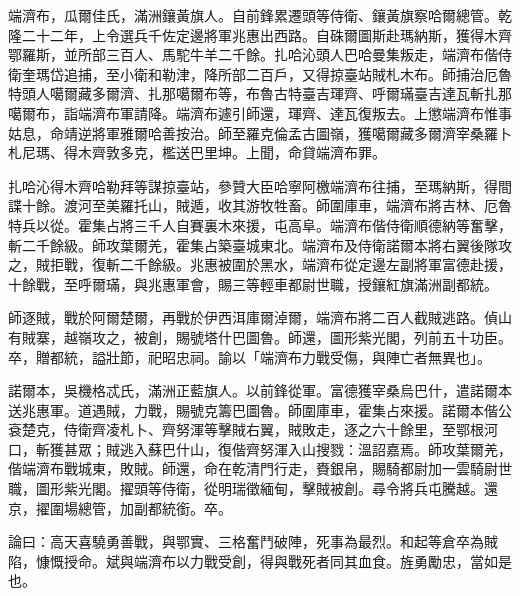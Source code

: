 \begin{pinyinscope}
端濟布，瓜爾佳氏，滿洲鑲黃旗人。自前鋒累遷頭等侍衛、鑲黃旗察哈爾總管。乾隆二十二年，上令選兵千佐定邊將軍兆惠出西路。自硃爾圖斯赴瑪納斯，獲得木齊鄂羅斯，並所部三百人、馬駝牛羊二千餘。扎哈沁頭人巴哈曼集叛走，端濟布偕侍衛奎瑪岱追捕，至小衛和勒津，降所部二百戶，又得掠臺站賊札木布。師捕治厄魯特頭人噶爾藏多爾濟、扎那噶爾布等，布魯古特臺吉琿齊、呼爾璊臺吉達瓦斬扎那噶爾布，詣端濟布軍請降。端濟布遽引師還，琿齊、達瓦復叛去。上懲端濟布惟事姑息，命靖逆將軍雅爾哈善按治。師至羅克倫孟古圖嶺，獲噶爾藏多爾濟宰桑羅卜札尼瑪、得木齊敦多克，檻送巴里坤。上聞，命貸端濟布罪。

扎哈沁得木齊哈勒拜等謀掠臺站，參贊大臣哈寧阿檄端濟布往捕，至瑪納斯，得間諜十餘。渡河至美羅托山，賊遁，收其游牧牲畜。師圍庫車，端濟布將吉林、厄魯特兵以從。霍集占將三千人自賽裏木來援，屯高阜。端濟布偕侍衛順德納等奮擊，斬二千餘級。師攻葉爾羌，霍集占築臺城東北。端濟布及侍衛諾爾本將右翼後隊攻之，賊拒戰，復斬二千餘級。兆惠被圍於黑水，端濟布從定邊左副將軍富德赴援，十餘戰，至呼爾璊，與兆惠軍會，賜三等輕車都尉世職，授鑲紅旗滿洲副都統。

師逐賊，戰於阿爾楚爾，再戰於伊西洱庫爾淖爾，端濟布將二百人截賊逃路。偵山有賊寨，越嶺攻之，被創，賜號塔什巴圖魯。師還，圖形紫光閣，列前五十功臣。卒，贈都統，謚壯節，祀昭忠祠。諭以「端濟布力戰受傷，與陣亡者無異也」。

諾爾本，吳機格忒氏，滿洲正藍旗人。以前鋒從軍。富德獲宰桑烏巴什，遣諾爾本送兆惠軍。道遇賊，力戰，賜號克籌巴圖魯。師圍庫車，霍集占來援。諾爾本偕公袞楚克，侍衛齊凌札卜、齊努渾等擊賊右翼，賊敗走，逐之六十餘里，至鄂根河口，斬獲甚眾；賊逃入蘇巴什山，復偕齊努渾入山搜戮：溫詔嘉焉。師攻葉爾羌，偕端濟布戰城東，敗賊。師還，命在乾清門行走，賚銀帛，賜騎都尉加一雲騎尉世職，圖形紫光閣。擢頭等侍衛，從明瑞徵緬甸，擊賊被創。尋令將兵屯騰越。還京，擢圍場總管，加副都統銜。卒。

論曰：高天喜驍勇善戰，與鄂實、三格奮鬥破陣，死事為最烈。和起等倉卒為賊陷，慷慨授命。斌與端濟布以力戰受創，得與戰死者同其血食。旌勇勵忠，當如是也。


\end{pinyinscope}